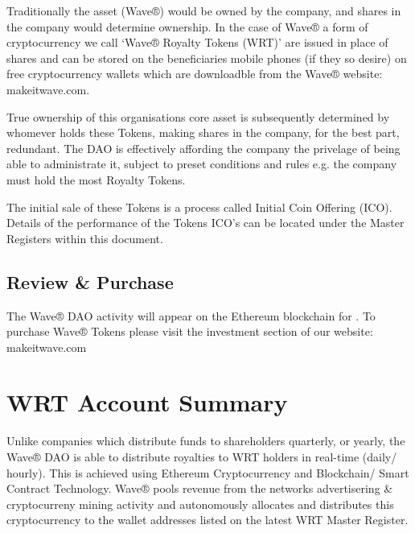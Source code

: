\documentclass[letterpaper,10pt,openany,oneside,english]{sphinxmanual}
\begin{document}
Traditionally the asset (Wave®) would be owned by the company, and shares in the company would determine ownership.
In the case of Wave® a form of cryptocurrency we call ‘Wave® Royalty Tokens (WRT)’ are issued in place of shares and can be stored on the beneficiaries mobile phones (if they so desire) on free cryptocurrency wallets which are downloadble from the Wave®  website: makeitwave.com.

True ownership of this organisations core asset is subsequently determined by whomever holds these Tokens, making shares in the company, for the best part, redundant.
The DAO is effectively affording the company the privelage of being able to administrate it, subject to preset conditions and rules e.g. the company must hold the most Royalty Tokens.

The initial sale of these Tokens is a process called Initial Coin Offering (ICO).
Details of the performance of the Tokens ICO’s can be located under the Master Registers within this document.


\section{Review \& Purchase}
\label{\detokenize{introduction:review-purchase}}
The Wave® DAO activity will appear on the Ethereum blockchain for .
To purchase Wave® Tokens please visit the investment section of our website: makeitwave.com


\chapter{WRT Account Summary}
\label{\detokenize{wrt-summary:wrt-account-summary}}\label{\detokenize{wrt-summary::doc}}
Unlike companies which distribute funds to shareholders quarterly, or yearly, the Wave® DAO is able to distribute royalties to WRT holders in real-time (daily/ hourly). This is achieved using Ethereum Cryptocurrency and Blockchain/ Smart Contract Technology. Wave® pools revenue from the networks advertisering \& cryptocurreny mining activity and autonomously allocates and distributes this cryptocurrency to the wallet addresses listed on the latest WRT Master Register.
\end{document}
